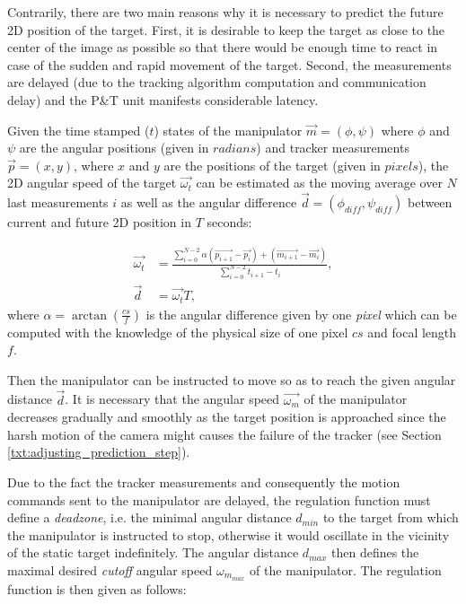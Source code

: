 Contrarily, there are two main reasons why it is necessary to predict the future 2D position of the target. First, it is desirable to keep the target as close to the center of the image as possible so that there would be enough time to react in case of the sudden and rapid movement of the target. Second, the measurements are delayed (due to the tracking algorithm computation and communication delay) and the P\&T unit manifests considerable latency.

Given the time stamped ($t$) states of the manipulator $\vec{m} = (\phi, \psi)$ where $\phi$ and $\psi$ are the angular positions (given in $radians$) and tracker measurements $\vec{p} = (x, y)$, where $x$ and $y$ are the positions of the target (given in $pixels$), the 2D angular speed of the target $\vec{\omega_{t}}$ can be estimated as the moving average over $N$ last measurements $i$ as well as the angular difference $\vec{d} = (\phi_{diff}, \psi_{diff})$ between current and future 2D position in $T$ seconds:

\begin{align}
	\vec{\omega_{t}} &= \frac{\sum_{i=0}^{N-2}{\alpha(\vec{p_{i+1}} - \vec{p_{i}}) + (\vec{m_{i+1}} - \vec{m_{i}})}}{\sum_{i=0}^{N-2}{t_{i+1} - t_{i}}},\\
	\vec{d} &= \vec{\omega_{t}}T,
\end{align}
where $\alpha = \arctan{(\frac{cs}{f})}$ is the angular difference given by one \textit{pixel} which can be computed with the knowledge of the physical size of one pixel $cs$ and focal length $f$.

Then the manipulator can be instructed to move so as to reach the given angular distance $\vec{d}$. It is necessary that the angular speed $\vec{\omega_{m}}$ of the manipulator decreases gradually and smoothly as the target position is approached since the harsh motion of the camera might causes the failure of the tracker (see Section \ref{txt:adjusting_prediction_step}).

Due to the fact the tracker measurements and consequently the motion commands sent to the manipulator are delayed, the regulation function must define a \textit{deadzone}, i.e. the minimal angular distance $d_{min}$ to the target from which the manipulator is instructed to stop, otherwise it would oscillate in the vicinity of the static target indefinitely. The angular distance $d_{max}$ then defines the maximal desired \textit{cutoff} angular speed $\omega_{m_{max}}$ of the manipulator. The regulation function is then given as follows:

